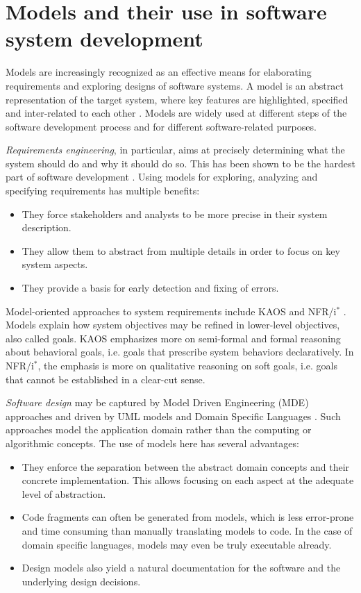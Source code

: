 \section{Models and their use in software system development\label{section:intro-models}}

Models are increasingly recognized as an effective means for elaborating requirements and exploring designs of software systems. A model is an abstract representation of the target system, where key features are highlighted, specified and inter-related to each other \cite{VanLamsweerde:2009}. Models are widely used at different steps of the software development process and for different software-related purposes.


\emph{Requirements engineering}, in particular, aims at precisely determining what the system should do and why it should do so. This has been shown to be the hardest part of software development \cite{Brooks:1987}. Using models for exploring, analyzing and specifying requirements has multiple benefits:
\begin{itemize}
\item They force stakeholders and analysts to be more precise in their system description.
\item They allow them to abstract from multiple details in order to focus on key system aspects.
\item They provide a basis for early detection and fixing of errors.
\end{itemize}
Model-oriented approaches to system requirements include KAOS \cite{VanLamsweerde:2009} and NFR/i$^*$ \cite{Mylopoulos:1992, Yu:1993}. Models explain how system objectives may be refined in lower-level objectives, also called goals. KAOS emphasizes more on semi-formal and formal reasoning about behavioral goals, i.e. goals that prescribe system behaviors declaratively. In NFR/i$^*$, the emphasis is more on qualitative reasoning on soft goals, i.e. goals that cannot be established in a clear-cut sense.


\emph{Software design} may be captured by Model Driven Engineering (MDE) approaches and driven by UML models \cite{OMG:2004} and Domain Specific Languages \cite{VanDeursen:2000, Fowler:2010}. Such approaches model the application domain rather than the computing or algorithmic concepts. The use of models here has several advantages:
\begin{itemize}
\item They enforce the separation between the abstract domain concepts and their concrete implementation. This allows focusing on each aspect at the adequate level of abstraction.
\item Code fragments can often be generated from models, which is less error-prone and time consuming than manually translating models to code. In the case of domain specific languages, models may even be truly executable already. 
\item Design models also yield a natural documentation for the software and the underlying design decisions. 
\end{itemize}

